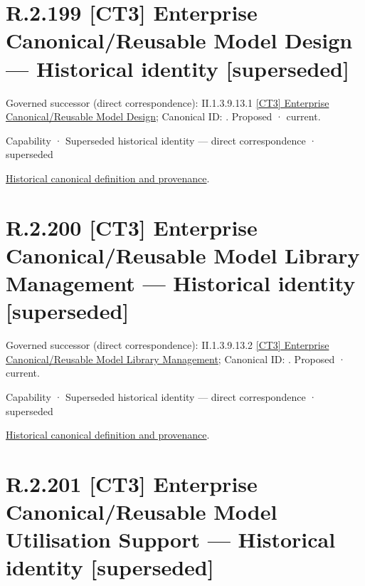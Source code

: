 \section*{R.2.199 [CT3] Enterprise Canonical/Reusable Model Design — Historical identity [superseded]}
\label{navigation:R.2.199}

{\small Governed successor (direct correspondence): II.1.3.9.13.1 \hyperref[element:90e9cd401ddf4c7690c978d8dd131413]{[CT3] Enterprise Canonical/Reusable Model Design}; Canonical ID: \texttt{}. Proposed · current.}\par
\label{element:dbc37445ad944a85a7c4f26f410967b2}
{\small Capability · Superseded historical identity — direct correspondence · superseded}\par
\href{../../../../../../../continuum/strategy/capability/dbc37445ad944a85a7c4f26f410967b2.md}{Historical canonical definition and provenance}.\par
\section*{R.2.200 [CT3] Enterprise Canonical/Reusable Model Library Management — Historical identity [superseded]}
\label{navigation:R.2.200}

{\small Governed successor (direct correspondence): II.1.3.9.13.2 \hyperref[element:76943b4b68644c4dac1368fce8bb20d9]{[CT3] Enterprise Canonical/Reusable Model Library Management}; Canonical ID: \texttt{}. Proposed · current.}\par
\label{element:f5eccd4f65df49bba98104e5abfa5e19}
{\small Capability · Superseded historical identity — direct correspondence · superseded}\par
\href{../../../../../../../continuum/strategy/capability/f5eccd4f65df49bba98104e5abfa5e19.md}{Historical canonical definition and provenance}.\par
\section*{R.2.201 [CT3] Enterprise Canonical/Reusable Model Utilisation Support — Historical identity [superseded]}
\label{navigation:R.2.201}

